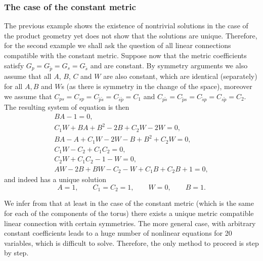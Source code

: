 \documentclass[10pt,a4paper]{amsart}
\numberwithin{equation}{section}
\newcommand{\ip}{{\tilde{p}}}
\newcommand{\is}{{\tilde{s}}}
\begin{document}
\subsubsection{The case of the constant metric}
The previous example shows the existence of nontrivial solutions in the case of the product geometry yet does not show that the solutions are unique. Therefore, for the second example we shall ask the question of all linear connections compatible with the constant metric. Suppose now that the metric coefficients satisfy $G_p=G_\ip = G_s=G_\is$ and are constant. By symmetry arguments
we also assume that all $A$, $B$, $C$ and $W$ are also constant, which are identical (separately) for all $A,B$ and $W$s (as there is symmetry in the change of the space), moreover we assume that $C_{ps}=C_{sp}=C_{\ip\is}=C_{\is\ip}=C_1$ and $C_{p\is}=C_{\ip s}=C_{\is p}=C_{s\ip}=C_2$. The resulting system of equation is then
\begin{gather*}
BA-1 =0, \\
C_1 W + BA + B^2 -2B +C_2W - 2W =0, \\
BA -A + C_1W - 2W -B +B^2 +C_2W = 0,\\
C_1W - C_2 +C_1 C_2 =0, \\
C_2W + C_1C_2 -1 -W =0, \\
AW - 2B +BW -C_2-W+C_1B+C_2B+1=0,
\end{gather*}
and indeed has a unique solution
\[ A=1, \qquad C_1=C_2=1, \qquad W=0, \qquad B=1. \]

We infer from that at least in the case of the constant metric (which is the same for each of the components
of the torus) there exists a unique metric compatible linear connection with certain symmetries. The more general
case, with arbitrary constant coefficients leads to a huge number of nonlinear equations for 20 variables, which
is difficult to solve. Therefore, the only method to proceed is step by step.
\end{document}
